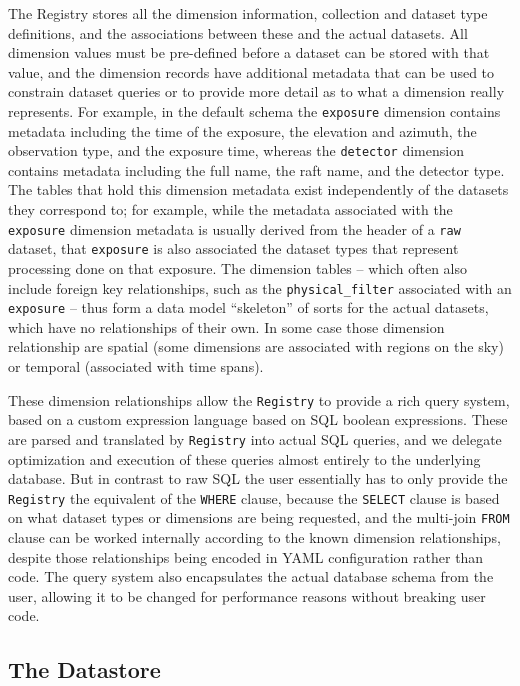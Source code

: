\documentclass[]{spie}
\begin{document}
The Registry stores all the dimension information, collection and dataset type definitions, and the associations between these and the actual datasets.
All dimension values must be pre-defined before a dataset can be stored with that value, and the dimension records have additional metadata that can be used to constrain dataset queries or to provide more detail as to what a dimension really represents.
For example, in the default schema the \texttt{exposure} dimension contains metadata including the time of the exposure, the elevation and azimuth, the observation type, and the exposure time, whereas the \texttt{detector} dimension contains metadata including the full name, the raft name, and the detector type.
The tables that hold this dimension metadata exist independently of the datasets they correspond to; for example, while the metadata associated with the \texttt{exposure} dimension metadata is usually derived from the header of a \texttt{raw} dataset, that \texttt{exposure} is also associated the dataset types that represent processing done on that exposure.
The dimension tables -- which often also include foreign key relationships, such as the \texttt{physical\_filter} associated with an \texttt{exposure} -- thus form a data model ``skeleton'' of sorts for the actual datasets, which have no relationships of their own.
In some case those dimension relationship are spatial (some dimensions are associated with regions on the sky) or temporal (associated with time spans).

These dimension relationships allow the \texttt{Registry} to provide a rich query system, based on a custom expression language based on SQL boolean expressions.
These are parsed and translated by \texttt{Registry} into actual SQL queries, and we delegate optimization and execution of these queries almost entirely to the underlying database.
But in contrast to raw SQL the user essentially has to only provide the \texttt{Registry} the equivalent of the \texttt{WHERE} clause, because the \texttt{SELECT} clause is based on what dataset types or dimensions are being requested, and the multi-join \texttt{FROM} clause can be worked internally according to the known dimension relationships, despite those relationships being encoded in YAML configuration rather than code.
The query system also encapsulates the actual database schema from the user, allowing it to be changed for performance reasons without breaking user code.

\subsection{The Datastore}
\end{document}
